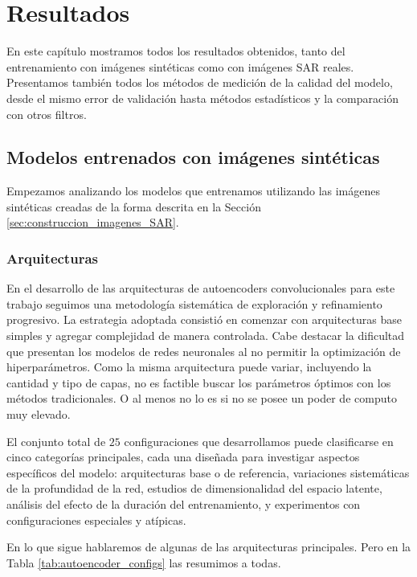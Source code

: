 \chapter{Resultados}
\label{resultados}

En este capítulo mostramos todos los resultados obtenidos, tanto del entrenamiento con imágenes sintéticas como con imágenes SAR reales. Presentamos también todos los métodos de medición de la calidad del modelo, desde el mismo error de validación hasta métodos estadísticos y la comparación con otros filtros.

\section{Modelos entrenados con imágenes sintéticas}

Empezamos analizando los modelos que entrenamos utilizando las imágenes sintéticas creadas de la forma descrita en la Sección \ref{sec:construccion_imagenes_SAR}.

\subsection{Arquitecturas}


En el desarrollo de las arquitecturas de autoencoders convolucionales para este trabajo seguimos una metodología sistemática de exploración y refinamiento progresivo. La estrategia adoptada consistió en comenzar con arquitecturas base simples y agregar complejidad de manera controlada. Cabe destacar la dificultad que presentan los modelos de redes neuronales al no permitir la optimización de hiperparámetros. Como la misma arquitectura puede variar, incluyendo la cantidad y tipo de capas, no es factible buscar los parámetros óptimos con los métodos tradicionales. O al menos no lo es si no se posee un poder de computo muy elevado.

El conjunto total de $25$ configuraciones que desarrollamos puede clasificarse en cinco categorías principales, cada una diseñada para investigar aspectos específicos del modelo: arquitecturas base o de referencia, variaciones sistemáticas de la profundidad de la red, estudios de dimensionalidad del espacio latente, análisis del efecto de la duración del entrenamiento, y experimentos con configuraciones especiales y atípicas.

En lo que sigue hablaremos de algunas de las arquitecturas principales. Pero en la Tabla \ref{tab:autoencoder_configs} las resumimos a todas.


